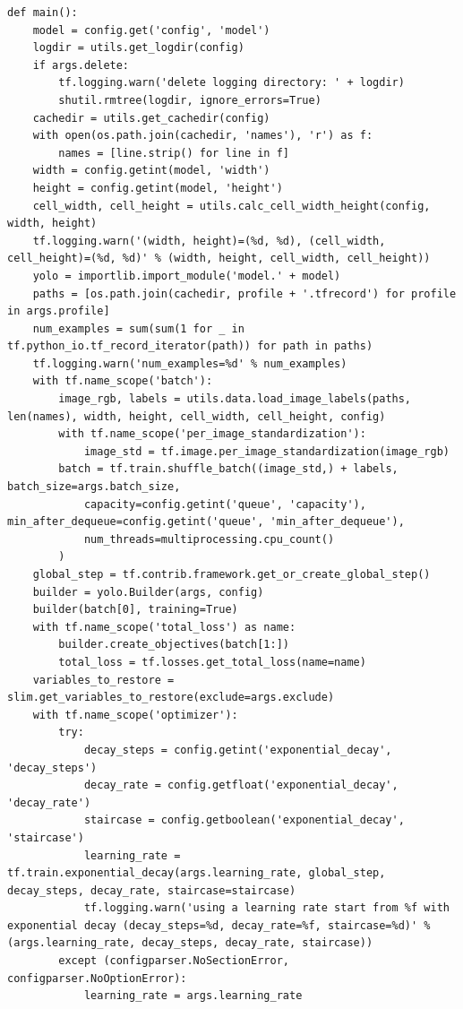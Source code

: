 \begin{lstlisting}
def main():
    model = config.get('config', 'model')
    logdir = utils.get_logdir(config)
    if args.delete:
        tf.logging.warn('delete logging directory: ' + logdir)
        shutil.rmtree(logdir, ignore_errors=True)
    cachedir = utils.get_cachedir(config)
    with open(os.path.join(cachedir, 'names'), 'r') as f:
        names = [line.strip() for line in f]
    width = config.getint(model, 'width')
    height = config.getint(model, 'height')
    cell_width, cell_height = utils.calc_cell_width_height(config, width, height)
    tf.logging.warn('(width, height)=(%d, %d), (cell_width, cell_height)=(%d, %d)' % (width, height, cell_width, cell_height))
    yolo = importlib.import_module('model.' + model)
    paths = [os.path.join(cachedir, profile + '.tfrecord') for profile in args.profile]
    num_examples = sum(sum(1 for _ in tf.python_io.tf_record_iterator(path)) for path in paths)
    tf.logging.warn('num_examples=%d' % num_examples)
    with tf.name_scope('batch'):
        image_rgb, labels = utils.data.load_image_labels(paths, len(names), width, height, cell_width, cell_height, config)
        with tf.name_scope('per_image_standardization'):
            image_std = tf.image.per_image_standardization(image_rgb)
        batch = tf.train.shuffle_batch((image_std,) + labels, batch_size=args.batch_size,
            capacity=config.getint('queue', 'capacity'), min_after_dequeue=config.getint('queue', 'min_after_dequeue'),
            num_threads=multiprocessing.cpu_count()
        )
    global_step = tf.contrib.framework.get_or_create_global_step()
    builder = yolo.Builder(args, config)
    builder(batch[0], training=True)
    with tf.name_scope('total_loss') as name:
        builder.create_objectives(batch[1:])
        total_loss = tf.losses.get_total_loss(name=name)
    variables_to_restore = slim.get_variables_to_restore(exclude=args.exclude)
    with tf.name_scope('optimizer'):
        try:
            decay_steps = config.getint('exponential_decay', 'decay_steps')
            decay_rate = config.getfloat('exponential_decay', 'decay_rate')
            staircase = config.getboolean('exponential_decay', 'staircase')
            learning_rate = tf.train.exponential_decay(args.learning_rate, global_step, decay_steps, decay_rate, staircase=staircase)
            tf.logging.warn('using a learning rate start from %f with exponential decay (decay_steps=%d, decay_rate=%f, staircase=%d)' % (args.learning_rate, decay_steps, decay_rate, staircase))
        except (configparser.NoSectionError, configparser.NoOptionError):
            learning_rate = args.learning_rate

\end{lstlisting}
